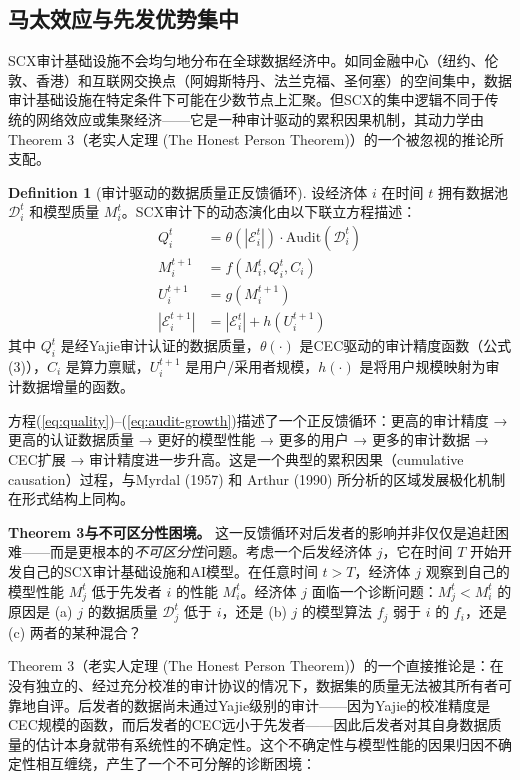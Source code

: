 \documentclass[12pt,a4paper]{ctexart}
\theoremstyle{definition}
\newtheorem{definition}{Definition}[section]
\theoremstyle{remark}
\begin{document}
\subsection{马太效应与先发优势集中}

SCX审计基础设施不会均匀地分布在全球数据经济中。如同金融中心（纽约、伦敦、香港）和互联网交换点（阿姆斯特丹、法兰克福、圣何塞）的空间集中，数据审计基础设施在特定条件下可能在少数节点上汇聚。但SCX的集中逻辑不同于传统的网络效应或集聚经济——它是一种审计驱动的累积因果机制，其动力学由Theorem 3（老实人定理 (The Honest Person Theorem)）的一个被忽视的推论所支配。

\begin{definition}[审计驱动的数据质量正反馈循环]
设经济体 $i$ 在时间 $t$ 拥有数据池 $\mathcal{D}_i^t$ 和模型质量 $M_i^t$。SCX审计下的动态演化由以下联立方程描述：
\begin{align}
Q_i^t &= \theta(|\mathcal{E}_i^t|) \cdot \text{Audit}(\mathcal{D}_i^t) \label{eq:quality}\\
M_i^{t+1} &= f(M_i^t, Q_i^t, C_i) \label{eq:model}\\
U_i^{t+1} &= g(M_i^{t+1}) \label{eq:users}\\
|\mathcal{E}_i^{t+1}| &= |\mathcal{E}_i^t| + h(U_i^{t+1}) \label{eq:audit-growth}
\end{align}
其中 $Q_i^t$ 是经Yajie审计认证的数据质量，$\theta(\cdot)$ 是CEC驱动的审计精度函数（公式(3)），$C_i$ 是算力禀赋，$U_i^{t+1}$ 是用户/采用者规模，$h(\cdot)$ 是将用户规模映射为审计数据增量的函数。
\end{definition}

方程(\ref{eq:quality})–(\ref{eq:audit-growth})描述了一个正反馈循环：更高的审计精度 → 更高的认证数据质量 → 更好的模型性能 → 更多的用户 → 更多的审计数据 → CEC扩展 → 审计精度进一步升高。这是一个典型的累积因果（cumulative causation）过程，与Myrdal (1957) 和 Arthur (1990) 所分析的区域发展极化机制在形式结构上同构。

\textbf{Theorem 3与不可区分性困境。} 这一反馈循环对后发者的影响并非仅仅是追赶困难——而是更根本的\textit{不可区分性}问题。考虑一个后发经济体 $j$，它在时间 $T$ 开始开发自己的SCX审计基础设施和AI模型。在任意时间 $t > T$，经济体 $j$ 观察到自己的模型性能 $M_j^t$ 低于先发者 $i$ 的性能 $M_i^t$。经济体 $j$ 面临一个诊断问题：$M_j^t < M_i^t$ 的原因是 (a) $j$ 的数据质量 $\mathcal{D}_j^t$ 低于 $i$，还是 (b) $j$ 的模型算法 $f_j$ 弱于 $i$ 的 $f_i$，还是 (c) 两者的某种混合？

Theorem 3（老实人定理 (The Honest Person Theorem)）的一个直接推论是：在没有独立的、经过充分校准的审计协议的情况下，数据集的质量无法被其所有者可靠地自评。后发者的数据尚未通过Yajie级别的审计——因为Yajie的校准精度是CEC规模的函数，而后发者的CEC远小于先发者——因此后发者对其自身数据质量的估计本身就带有系统性的不确定性。这个不确定性与模型性能的因果归因不确定性相互缠绕，产生了一个不可分解的诊断困境：
\end{document}
